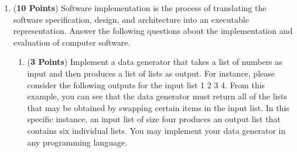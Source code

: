\documentclass[12pt,epsf,psfig,graphics]{article}
\begin{document}
\begin{enumerate}







\newpage

\item ({\bf 10 Points}) Software implementation is the process of
  translating the software specification, design, and architecture
  into an executable representation.  Answer the following questions
  about the implementation and evaluation of computer software.

\begin{enumerate}

  \item ({\bf 3 Points}) Implement a data generator that takes a list
    of numbers as input and then produces a list of lists as output.
    For instance, please consider the following outputs for the input
    list 1 2 3 4.  From this example, you can see that the data
    generator must return all of the lists that may be obtained by
    swapping certain items in the input list.  In this specific
    instance, an input list of size four produces an output list that
    contains six individual lists.  You may implement your data
    generator in any programming language.


\end{enumerate}
\end{enumerate}
\end{document}

